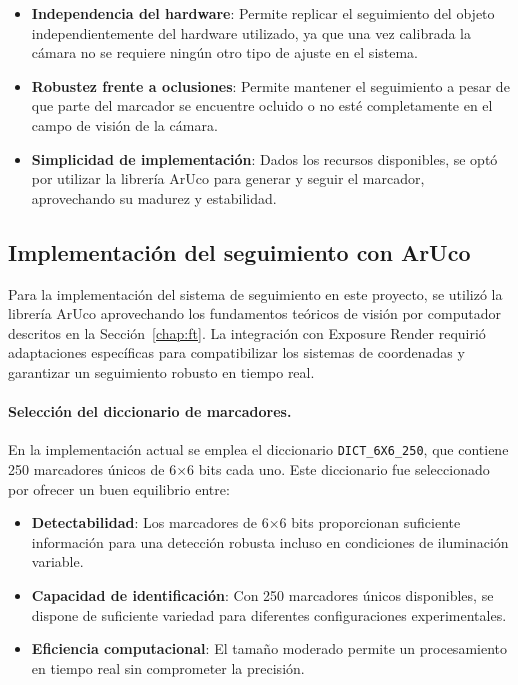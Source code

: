 \begin{itemize}
    \item \textbf{Independencia del hardware}: Permite replicar el seguimiento del objeto independientemente del hardware utilizado, ya que una vez calibrada la cámara no se requiere ningún otro tipo de ajuste en el sistema.
    \item \textbf{Robustez frente a oclusiones}: Permite mantener el seguimiento a pesar de que parte del marcador se encuentre ocluido o no esté completamente en el campo de visión de la cámara.
    \item \textbf{Simplicidad de implementación}: Dados los recursos disponibles, se optó por utilizar la librería ArUco para generar y seguir el marcador, aprovechando su madurez y estabilidad.
\end{itemize}

\subsection{Implementación del seguimiento con ArUco}

Para la implementación del sistema de seguimiento en este proyecto, se utilizó la librería ArUco aprovechando los fundamentos teóricos de visión por computador descritos en la Sección~\ref{chap:ft}. La integración con Exposure Render requirió adaptaciones específicas para compatibilizar los sistemas de coordenadas y garantizar un seguimiento robusto en tiempo real.

\paragraph{Selección del diccionario de marcadores.}
En la implementación actual se emplea el diccionario \texttt{DICT\_6X6\_250}, que contiene 250 marcadores únicos de 6×6 bits cada uno. Este diccionario fue seleccionado por ofrecer un buen equilibrio entre:

\begin{itemize}
	\item \textbf{Detectabilidad}: Los marcadores de 6×6 bits proporcionan suficiente información para una detección robusta incluso en condiciones de iluminación variable.
	\item \textbf{Capacidad de identificación}: Con 250 marcadores únicos disponibles, se dispone de suficiente variedad para diferentes configuraciones experimentales.
	\item \textbf{Eficiencia computacional}: El tamaño moderado permite un procesamiento en tiempo real sin comprometer la precisión.
\end{itemize}

